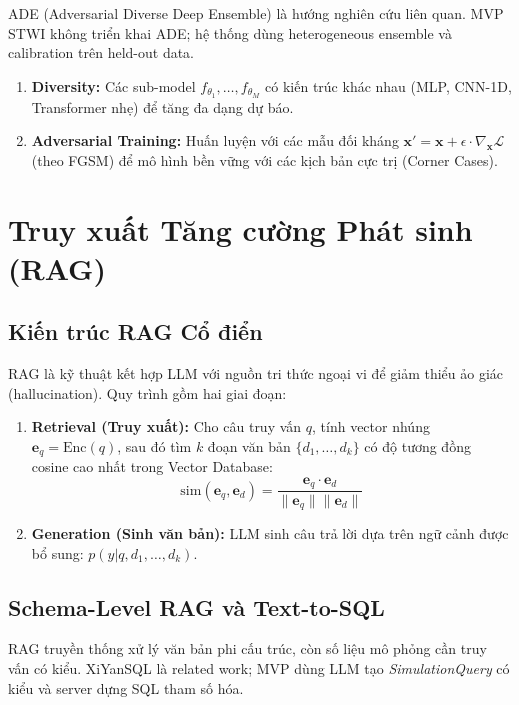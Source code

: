 ADE (Adversarial Diverse Deep Ensemble) là hướng nghiên cứu liên quan. MVP STWI không triển khai ADE; hệ thống dùng heterogeneous ensemble và calibration trên held-out data.
\begin{enumerate}[itemsep=3pt]
  \item \textbf{Diversity:} Các sub-model $f_{\theta_1}, \ldots, f_{\theta_M}$ có kiến trúc khác nhau (MLP, CNN-1D, Transformer nhẹ) để tăng đa dạng dự báo.
  \item \textbf{Adversarial Training:} Huấn luyện với các mẫu đối kháng $\mathbf{x}' = \mathbf{x} + \epsilon \cdot \nabla_\mathbf{x} \mathcal{L}$ (theo FGSM) để mô hình bền vững với các kịch bản cực trị (Corner Cases).
\end{enumerate}

\section{Truy xuất Tăng cường Phát sinh (RAG)}

\subsection{Kiến trúc RAG Cổ điển}

RAG \cite{lewis2020rag} là kỹ thuật kết hợp LLM với nguồn tri thức ngoại vi để giảm thiểu ảo giác (hallucination). Quy trình gồm hai giai đoạn:

\begin{enumerate}[itemsep=4pt]
  \item \textbf{Retrieval (Truy xuất):} Cho câu truy vấn $q$, tính vector nhúng $\mathbf{e}_q = \text{Enc}(q)$, sau đó tìm $k$ đoạn văn bản $\{d_1, \ldots, d_k\}$ có độ tương đồng cosine cao nhất trong Vector Database:
    \begin{equation}
      \text{sim}(\mathbf{e}_q, \mathbf{e}_d) = \frac{\mathbf{e}_q \cdot \mathbf{e}_d}{\|\mathbf{e}_q\|\|\mathbf{e}_d\|}
      \label{eq:cosine}
    \end{equation}
  \item \textbf{Generation (Sinh văn bản):} LLM sinh câu trả lời dựa trên ngữ cảnh được bổ sung: $p(y|q, d_1, \ldots, d_k)$.
\end{enumerate}

\subsection{Schema-Level RAG và Text-to-SQL}

RAG truyền thống xử lý văn bản phi cấu trúc, còn số liệu mô phỏng cần truy vấn có kiểu. XiYanSQL \cite{guo2023xiyansql} là related work; MVP dùng LLM tạo \textit{SimulationQuery} có kiểu và server dựng SQL tham số hóa.

